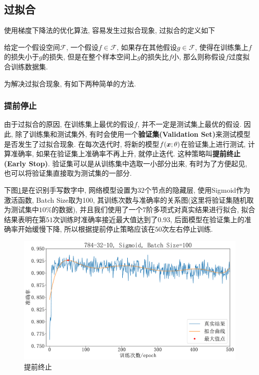 \documentclass[12pt, a4paper, oneside]{ctexart}
\begin{document}
\subsection{过拟合}
使用梯度下降法的优化算法, 容易发生过拟合现象, 过拟合的定义如下
\begin{definition}[过拟合]
    给定一个假设空间$\mathcal{F}$, 一个假设$f\in\mathcal{F}$, 如果存在其他假设$g\in\mathcal{F}$, 使得在训练集上$f$的损失小于$g$的损失, 但是在整个样本空间上$g$的损失比$f$小, 那么则称假设$f$过度拟合训练数据集.
\end{definition}
为解决过拟合现象, 有如下两种简单的方法.
\subsubsection{提前停止}
由于过拟合的原因, 在训练集上最优的假设$f$, 并不一定是测试集上最优的假设. 因此, 除了训练集和测试集外, 有时会使用一个\textbf{验证集(Validation Set)}来测试模型是否发生了过拟合现象. 在每次迭代时, 将新的模型$f(\boldsymbol{x};\theta)$在验证集上进行测试, 计算准确率, 如果在验证集上准确率不再上升, 就停止迭代. 这种策略叫\textbf{提前终止(Early Stop)}. 验证集可以是从训练集中选取一小部分出来, 有时为了方便起见, 也可以将验证集直接取为测试集的一部分.

下图\ref{figure-early_stop}是在识别手写数字中, 网络模型设置为$32$个节点的隐藏层, 使用Sigmoid作为激活函数, Batch Size取为100, 其训练次数与准确率的关系图(这里将验证集随机取为测试集中$10\%$的数据), 并且我们使用了一个$7$阶多项式对真实结果进行拟合, 拟合结果表明在第$51$次训练时准确率接近最大值达到了$0.93$, 后面模型在验证集上的准确率开始缓慢下降, 所以根据提前停止策略应该在$50$次左右停止训练.
\begin{figure}[htbp]
    \centering
    \includegraphics[scale=0.45]{early_stop.pdf}
    \caption{提前终止}
    \label{figure-early_stop}
\end{figure}\del
\end{document}
